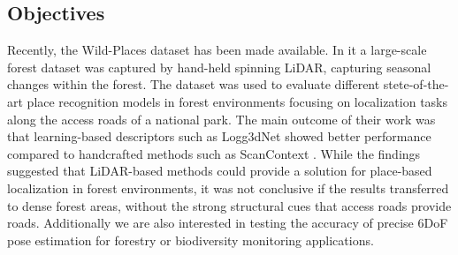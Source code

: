 \subsection*{Objectives}
Recently, the Wild-Places dataset \cite{knights2023icra} has been made available. In it a large-scale forest dataset was captured by hand-held spinning LiDAR, capturing seasonal changes within the forest. The dataset was used to evaluate different stete-of-the-art place recognition models in forest environments focusing on localization tasks along the access roads of a national park. The main outcome of their work was that learning-based descriptors such as Logg3dNet \cite{vidanapathirana2022icra} showed better performance compared to handcrafted methods such as ScanContext \cite{kim2018iros}. While the findings suggested that LiDAR-based methods could provide a solution for place-based localization in forest environments, it was not conclusive if the results transferred to dense forest areas, without the strong structural cues that access roads provide roads. Additionally we are also interested in testing the accuracy of precise 6DoF pose estimation for forestry or biodiversity monitoring applications.




